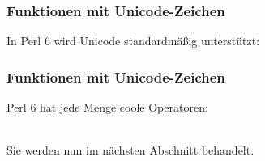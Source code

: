 \begin{frame}
	\frametitle{Funktionen mit Unicode-Zeichen}
	
	In Perl 6 wird Unicode standardmäßig unterstützt:
	
	
\end{frame}
\begin{frame}
	\frametitle{Funktionen mit Unicode-Zeichen}
	
	Perl 6 hat jede Menge coole Operatoren:
	
	
	\ \\
	Sie werden nun im nächsten Abschnitt behandelt.
\end{frame}
